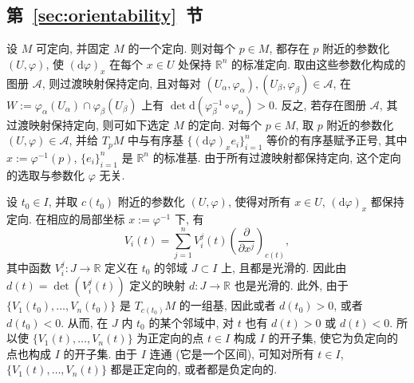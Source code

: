 \subsection{\texorpdfstring{第~\ref{sec:orientability}~节}{可定向性}}\label{subsec:solutions-orientability}

\begin{description}[font=\normalfont,leftmargin=2em,labelwidth=1.5em]
设 $M$ 可定向, 并固定 $M$ 的一个定向. 则对每个 $p\in M$, 都存在 $p$ 附近的参数化 $(U,\varphi)$, 使 $(\mathrm{d}\varphi)_x$ 在每个 $x\in U$ 处保持 $\mathbb{R}^n$ 的标准定向. 取由这些参数化构成的图册 $\mathcal{A}$, 则过渡映射保持定向, 且对每对 $(U_\alpha,\varphi_\alpha),(U_\beta,\varphi_\beta)\in\mathcal{A}$, 在 $W:=\varphi_\alpha(U_\alpha)\cap\varphi_\beta(U_\beta)$ 上有 $\det\mathrm{d}(\varphi_\beta^{-1}\circ\varphi_\alpha)>0$. 反之, 若存在图册 $\mathcal{A}$, 其过渡映射保持定向, 则可如下选定 $M$ 的定向. 对每个 $p\in M$, 取 $p$ 附近的参数化 $(U,\varphi)\in\mathcal{A}$, 并给 $T_pM$ 中与有序基 $\{(\mathrm{d}\varphi)_xe_i\}_{i=1}^n$ 等价的有序基赋予正号, 其中 $x:=\varphi^{-1}(p)$, $\{e_i\}_{i=1}^n$ 是 $\mathbb{R}^n$ 的标准基. 由于所有过渡映射都保持定向, 这个定向的选取与参数化 $\varphi$ 无关.

设 $t_0\in I$, 并取 $c(t_0)$ 附近的参数化 $(U,\varphi)$, 使得对所有 $x\in U$, $(\mathrm{d}\varphi)_x$ 都保持定向. 在相应的局部坐标 $x:=\varphi^{-1}$ 下, 有
\[
  V_i(t)=\sum_{j=1}^n V_i^j(t)\left(\frac{\partial}{\partial x^j}\right)_{c(t)},
\]
其中函数 $V_i^j:J\to\mathbb{R}$ 定义在 $t_0$ 的邻域 $J\subset I$ 上, 且都是光滑的. 因此由 $d(t)=\det(V_i^j(t))$ 定义的映射 $d:J\to\mathbb{R}$ 也是光滑的. 此外, 由于 $\{V_1(t_0),\ldots,V_n(t_0)\}$ 是 $T_{c(t_0)}M$ 的一组基, 因此或者 $d(t_0)>0$, 或者 $d(t_0)<0$. 从而, 在 $J$ 内 $t_0$ 的某个邻域中, 对 $t$ 也有 $d(t)>0$ 或 $d(t)<0$. 所以使 $\{V_1(t),\ldots,V_n(t)\}$ 为正定向的点 $t\in I$ 构成 $I$ 的开子集, 使它为负定向的点也构成 $I$ 的开子集. 由于 $I$ 连通 (它是一个区间), 可知对所有 $t\in I$, $\{V_1(t),\ldots,V_n(t)\}$ 都是正定向的, 或者都是负定向的.


\end{description}
